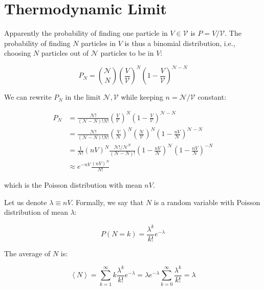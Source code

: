 \documentclass[12pt]{article}
\begin{document}
\section*{Thermodynamic Limit}


Apparently the probability of finding one particle in $V \in \mathcal{V}$ is $P = V/\mathcal{V}$. The probability of finding $N$ particles in $V$ is thus a binomial distribution, i.e., choosing $N$ particles out of $\mathcal{N}$ particles to be in $V$:

\begin{equation}
    P_{N} = \binom{\mathcal{N}}{N} \left( \frac{V}{\mathcal{V}} \right)^{N} \left( 1 - \frac{V}{\mathcal{V}} \right)^{\mathcal{N} - N}
\end{equation}

We can rewrite $P_{N}$ in the limit $\mathcal{N}, \mathcal{V}$ while keeping $n = \mathcal{N}/\mathcal{V}$ constant:

\begin{equation}
\begin{split}
    P_{N} &= \frac{\mathcal{N}!}{(\mathcal{N} - N)! N!} \left( \frac{V}{\mathcal{V}} \right)^{N} \left( 1 - \frac{V}{\mathcal{V}} \right)^{\mathcal{N} - N} \\
    &= \frac{\mathcal{N}!}{(\mathcal{N} - N)! N!} \left( \frac{V}{\mathcal{N}} \right)^{N} \left( \frac{\mathcal{N}}{\mathcal{V}} \right)^{N} \left( 1 - \frac{nV}{\mathcal{N}} \right)^{\mathcal{N} - N} \\
    &= \frac{1}{N!} (nV)^{N} \frac{\mathcal{N}!/\mathcal{N}^{N}}{(\mathcal{N} - N)!} \left( 1 - \frac{nV}{\mathcal{N}} \right)^{\mathcal{N}} \left( 1 - \frac{nV}{\mathcal{N}} \right)^{-N} \\
    &\approx e^{-nV} \frac{(nV)^{N}}{N!}
\end{split}
\end{equation}

which is the Poisson distribution with mean $nV$.

Let us denote $\lambda \equiv nV$. Formally, we say that $N$ is a random variable with Poisson distribution of mean $\lambda$:

\begin{equation}
    P(N = k) = \frac{\lambda^{k}}{k!} e^{-\lambda}
\end{equation}

The average of $N$ is:

\begin{equation}
    \left\langle N \right\rangle = \sum_{k=1}^{\infty} k \frac{\lambda^{k}}{k!} e^{-\lambda} = \lambda e^{-\lambda} \sum_{k=0}^{\infty} \frac{\lambda^{k}}{k!} = \lambda
\end{equation}
\end{document}
